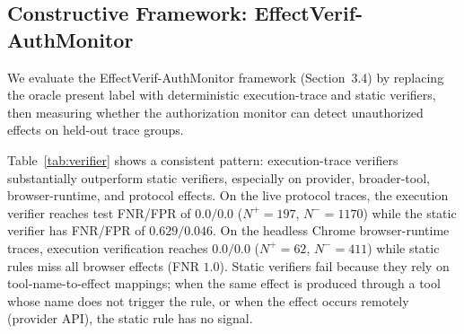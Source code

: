 \documentclass{article}
\begin{document}
\subsection{Constructive Framework: EffectVerif-AuthMonitor}

We evaluate the EffectVerif-AuthMonitor framework (Section~3.4) by replacing the oracle present label with deterministic execution-trace and static verifiers, then measuring whether the authorization monitor can detect unauthorized effects on held-out trace groups.

\begin{table}[t]
\centering
\caption{EffectVerif-AuthMonitor results. Thresholds selected on validation trace groups, evaluated on held-out trace groups. Static verifier uses tool-call rules without trace evidence. These are controlled diagnostics, not deployment calibration.}
\label{tab:verifier}
\end{table}

Table~\ref{tab:verifier} shows a consistent pattern: execution-trace verifiers substantially outperform static verifiers, especially on provider, broader-tool, browser-runtime, and protocol effects. On the live protocol traces, the execution verifier reaches test FNR/FPR of $0.0/0.0$ ($N^+=197$, $N^-=1170$) while the static verifier has FNR/FPR of $0.629/0.046$. On the headless Chrome browser-runtime traces, execution verification reaches $0.0/0.0$ ($N^+=62$, $N^-=411$) while static rules miss all browser effects (FNR $1.0$). Static verifiers fail because they rely on tool-name-to-effect mappings; when the same effect is produced through a tool whose name does not trigger the rule, or when the effect occurs remotely (provider API), the static rule has no signal.
\end{document}

